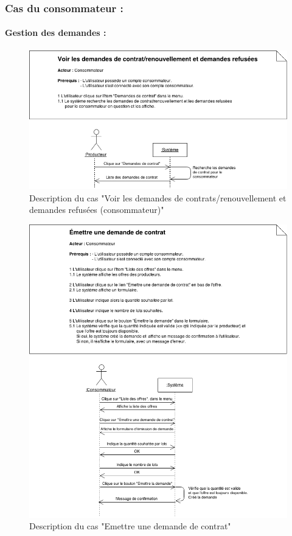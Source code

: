 \documentclass[12pt]{report}
\begin{document}
\subsubsection{Cas du consommateur :}
\paragraph*{Gestion des demandes :}

\begin{figure}[!h]
\centering
\includegraphics[width=1.\textwidth]{./ressources/desc_UC_voir_demandes_cons.png}
\caption{Description du cas "Voir les demandes de contrats/renouvellement et demandes refusées (consommateur)"}
\end{figure}
\clearpage

\begin{figure}[!h]
\centering
\includegraphics[width=1.\textwidth]{./ressources/desc_UC_emettre_demande.png}
\caption{Description du cas "Emettre une demande de contrat"}
\end{figure}
\clearpage
\end{document}

